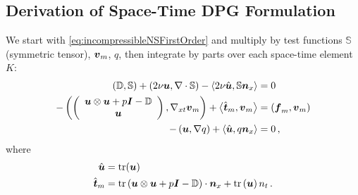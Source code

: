 \documentclass[Proposal.tex]{subfiles}
\begin{document}
\subsection{Derivation of Space-Time DPG Formulation}
We start with \eqref{eq:incompressibleNSFirstOrder} and multiply by test functions $\mathbb{S}$ (symmetric tensor), $\boldsymbol v_m$, $q$, 
then integrate by parts over each space-time element $K$:
\begin{subequations}
\label{eq:incompressibleNSBF}
\begin{align}
	\left( \mathbb{D},\mathbb{S} \right)+\left( 2\nu\boldsymbol u,\nabla\cdot\mathbb{S} \right)-\left\langle 2\nu\hat{\boldsymbol u},\mathbb{S}\boldsymbol n_x \right\rangle&=0\\
	-\left( \left( \begin{array}{c} \boldsymbol u\otimes\boldsymbol u+p\boldsymbol I-\mathbb{D}\\ \boldsymbol u\\ \end{array} \right),\nabla_{xt}\boldsymbol v_m \right)+\left\langle \hat{\boldsymbol t}_m,\boldsymbol v_m \right\rangle&=\left( \boldsymbol f_m,\boldsymbol v_m \right)\\
	-\left( \boldsymbol u,\nabla q \right)+\left\langle \hat{\boldsymbol u},q\boldsymbol n_x \right\rangle&=0\,,
\end{align}
\end{subequations}
where 
\begin{equation*}
\begin{aligned}
\hat{\boldsymbol u}&=\operatorname*{tr}(\boldsymbol u)\\
\hat{\boldsymbol t}_m&=\operatorname*{tr}\left( \boldsymbol u\otimes\boldsymbol u+p\boldsymbol I-\mathbb{D} \right)\cdot\boldsymbol n_x
+\operatorname*{tr}\left( \boldsymbol u \right) n_t\,.
\end{aligned}
\end{equation*}

%                                                                                                                  
%                                                                                                                  
%   
\end{document}
